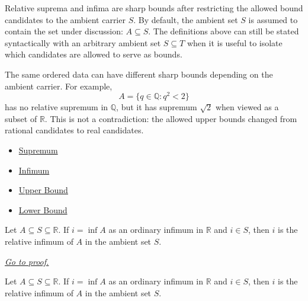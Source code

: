 \begin{remark*}[Interpretation]
Relative suprema and infima are sharp bounds after restricting the allowed
bound candidates to the ambient carrier $S$.
By default, the ambient set $S$ is assumed to contain the set under discussion:
$A\subseteq S$.  The definitions above can still be stated syntactically with
an arbitrary ambient set $S\subseteq T$ when it is useful to isolate which
candidates are allowed to serve as bounds.

The same ordered data can have different sharp bounds depending on the
ambient carrier.  For example,
\[
  A=\{q\in\mathbb{Q}:q^2<2\}
\]
has no relative supremum in $\mathbb{Q}$, but it has supremum $\sqrt{2}$ when
viewed as a subset of $\mathbb{R}$.  This is not a contradiction: the allowed
upper bounds changed from rational candidates to real candidates.
\end{remark*}

\begin{dependencies}
\begin{itemize}
  \item \hyperref[def:supremum]{Supremum}
  \item \hyperref[def:infimum]{Infimum}
  \item \hyperref[def:real-upper-bound]{Upper Bound}
  \item \hyperref[def:real-lower-bound]{Lower Bound}
\end{itemize}
\end{dependencies}

\begin{theorem}
\label{thm:ordinary-infimum-in-s-is-relative-infimum}
Let $A\subseteq S\subseteq\mathbb R$. If $i=\inf A$ as an ordinary infimum in $\mathbb R$ and $i\in S$, then $i$ is the relative infimum of $A$ in the ambient set $S$.

\smallskip
\noindent
\hyperref[prf:ordinary-infimum-in-s-is-relative-infimum]{\textit{Go to proof.}}
\end{theorem}

\begin{remark*}
Let $A\subseteq S\subseteq\mathbb R$. If $i=\inf A$ as an ordinary infimum in $\mathbb R$ and $i\in S$, then $i$ is the relative infimum of $A$ in the ambient set $S$.
\end{remark*}


